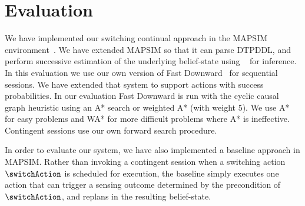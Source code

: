 \documentclass{article}
\begin{document}










\section{Evaluation}

We have implemented our switching continual approach in the MAPSIM
environment~\cite{brenner:nebel:jaamas09}. 
We have extended MAPSIM so that it can parse DTPDDL, and perform
successive estimation of the underlying belief-state using
~\cite{king:2009} for inference.  In this evaluation
we use our own version of Fast Downward~\cite{fast-downward} for
sequential sessions. We have extended that system to support actions
with success probabilities. In our evaluation Fast Downward is run
with the cyclic causal graph heuristic using an A* search or weighted
A* (with weight 5). We use A* for easy problems and WA* for more
difficult problems where A* is ineffective. Contingent sessions use
our own forward search procedure.



In order to evaluate our system, we have also implemented a baseline
approach in MAPSIM. Rather than invoking a contingent session when a
switching action $\switchAction$ is scheduled for execution, the
baseline simply executes one action that can trigger a sensing outcome
determined by the precondition of $\switchAction$, and replans in the
resulting belief-state.
\end{document}
